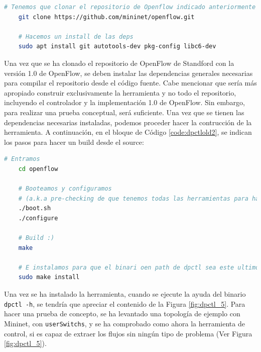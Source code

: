 \begin{lstlisting}[language= bash, style=Consola, caption={Instalación de las dependencias de la nueva versión de dpctl},label=code:dpctlold1]
    # Tenemos que clonar el repositorio de Openflow indicado anteriormente
    git clone https://github.com/mininet/openflow.git

    # Hacemos un install de las deps
    sudo apt install git autotools-dev pkg-config libc6-dev
\end{lstlisting}
\vspace{0.5cm}


Una vez que se ha clonado el repositorio de OpenFlow de Standford con la versión 1.0 de OpenFlow, se deben instalar las dependencias generales necesarias para compilar el repositorio desde el código fuente. Cabe mencionar que sería más apropiado construir exclusivamente la herramienta y no todo el repositorio, incluyendo el controlador y la implementación 1.0 de OpenFlow. Sin embargo, para realizar una prueba conceptual, será suficiente. Una vez que se tienen las dependencias necesarias instaladas, podemos proceder hacer la contrucción de la herramienta. A continuación, en el bloque de Código \ref{code:dpctlold2}, se indican los pasos para hacer un build desde el source:

\begin{lstlisting}[language= bash, style=Consola, caption={Construcción de la nueva versión de dpctl},label=code:dpctlold2]
    # Entramos
    cd openflow

    # Booteamos y configuramos 
    # (a.k.a pre-checking de que tenemos todas las herramientas para hacer el make)
    ./boot.sh
    ./configure

    # Build :)
    make

    # E instalamos para que el binari oen path de dpctl sea este ultimo
    sudo make install
\end{lstlisting}
\vspace{0.5cm}


Una vez se ha instalado la herramienta, cuando se ejecute la ayuda del binario \texttt{dpctl -h}, se tendría que apreciar el contenido de la Figura \ref{fig:dpctl_5}. Para hacer una prueba de concepto, se ha levantado una topología de ejemplo con Mininet, con \texttt{userSwitchs}, y se ha comprobado como ahora la herramienta de control, si es capaz de extraer los flujos sin ningún tipo de problema (Ver Figura \ref{fig:dpctl_5}).
\newpage


